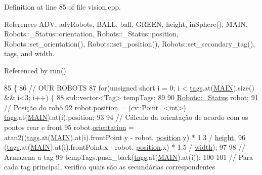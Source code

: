 Definition at line 85 of file vision.\+cpp.



References A\+DV, adv\+Robots, B\+A\+LL, ball, G\+R\+E\+EN, height, in\+Sphere(), M\+A\+IN, Robots\+::\+\_\+\+Status\+::orientation, Robots\+::\+\_\+\+Status\+::position, Robots\+::set\+\_\+orientation(), Robots\+::set\+\_\+position(), Robots\+::set\+\_\+secondary\+\_\+tag(), tags, and width.



Referenced by run().


\begin{DoxyCode}
85                         \{
86     \textcolor{comment}{// OUR ROBOTS}
87     \textcolor{keywordflow}{for}(\textcolor{keywordtype}{unsigned} \textcolor{keywordtype}{short} i = 0; i < \hyperlink{class_vision_acc5bbdf18ba36cc516c17999308be267}{tags}.at(\hyperlink{class_vision_ae7d1888ee66883aabbdfc7390d338367}{MAIN}).size() && i<3; i++) \{
88         std::vector<Tag> tempTags;
89 
90         \hyperlink{struct_robots_1_1___status}{Robots::\_Status} robot;
91         \textcolor{comment}{// Posição do robô}
92         robot.\hyperlink{struct_robots_1_1___status_a9ae95d6ec38055984ee4eaac82138373}{position} = (cv::Point\_<int>) \hyperlink{class_vision_acc5bbdf18ba36cc516c17999308be267}{tags}.at(\hyperlink{class_vision_ae7d1888ee66883aabbdfc7390d338367}{MAIN}).at(i).position;
93 
94         \textcolor{comment}{// Cálculo da orientação de acordo com os pontos rear e front}
95         robot.\hyperlink{struct_robots_1_1___status_ae7a5a28b09e25cf94607fc00b57f7c7e}{orientation} = atan2((\hyperlink{class_vision_acc5bbdf18ba36cc516c17999308be267}{tags}.at(\hyperlink{class_vision_ae7d1888ee66883aabbdfc7390d338367}{MAIN}).at(i).frontPoint.y - robot.
      \hyperlink{struct_robots_1_1___status_a9ae95d6ec38055984ee4eaac82138373}{position}.y) * 1.3 / \hyperlink{class_vision_aa6f52191ab439505b6156835594f1861}{height},
96                                   (\hyperlink{class_vision_acc5bbdf18ba36cc516c17999308be267}{tags}.at(\hyperlink{class_vision_ae7d1888ee66883aabbdfc7390d338367}{MAIN}).at(i).frontPoint.x - robot.
      \hyperlink{struct_robots_1_1___status_a9ae95d6ec38055984ee4eaac82138373}{position}.x) * 1.5 / \hyperlink{class_vision_ac82a1da77a8b08d112e5c4688bd70c3d}{width});
97 
98         \textcolor{comment}{// Armazena a tag}
99         tempTags.push\_back(\hyperlink{class_vision_acc5bbdf18ba36cc516c17999308be267}{tags}.at(\hyperlink{class_vision_ae7d1888ee66883aabbdfc7390d338367}{MAIN}).at(i));
100 
101         \textcolor{comment}{// Para cada tag principal, verifica quais são as secundárias correspondentes}

\end{DoxyCode}
